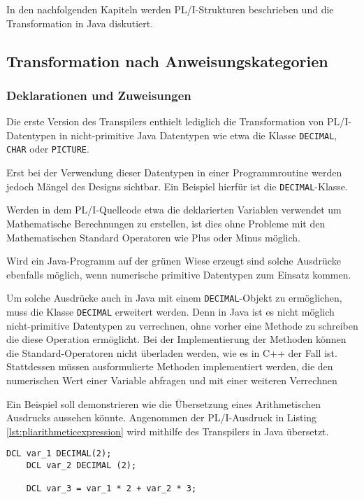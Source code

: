 In den nachfolgenden Kapiteln werden PL/I-Strukturen beschrieben und die Transformation in Java diskutiert.

\pagebreak
\subsection{Transformation nach Anweisungskategorien}
\subsubsection{Deklarationen und Zuweisungen}
Die erste Version des Transpilers enthielt lediglich die Transformation von PL/I-Datentypen in nicht-primitive Java Datentypen wie etwa die Klasse \verb+DECIMAL+, \verb+CHAR+ oder \verb+PICTURE+.


Erst bei der Verwendung dieser Datentypen in einer Programmroutine werden jedoch Mängel des Designs sichtbar. Ein Beispiel hierfür ist die \verb+DECIMAL+-Klasse.

Werden in dem PL/I-Quellcode etwa die deklarierten Variablen verwendet um Mathematische Berechnungen zu erstellen, ist dies ohne Probleme mit den Mathematischen Standard Operatoren wie Plus oder Minus möglich.

Wird ein Java-Programm auf der grünen Wiese erzeugt sind solche Ausdrücke ebenfalls möglich, wenn numerische primitive Datentypen zum Einsatz kommen.

Um solche Ausdrücke auch in Java mit einem \verb+DECIMAL+-Objekt zu ermöglichen, muss die Klasse \verb+DECIMAL+ erweitert werden.
Denn in Java ist es nicht möglich nicht-primitive Datentypen zu verrechnen, ohne vorher eine Methode zu schreiben die diese Operation ermöglicht. 
Bei der Implementierung der Methoden können die Standard-Operatoren nicht überladen werden, wie es in C++ der Fall ist.
Stattdessen müssen ausformulierte Methoden implementiert werden, die den numerischen Wert einer Variable abfragen und mit einer weiteren Verrechnen

Ein Beispiel soll demonstrieren wie die Übersetzung eines Arithmetischen Ausdrucks aussehen könnte.
Angenommen der PL/I-Ausdruck in Listing \ref{lst:pliarithmeticexpression} wird mithilfe des Transpilers in Java übersetzt.

\begin{lstlisting}[language=PL/I, caption=Arithmetischer Ausdruck in PL/I, label={lst:pliarithmeticexpression}]
	DCL var_1 DECIMAL(2);
	DCL var_2 DECIMAL (2);
	
	DCL var_3 = var_1 * 2 + var_2 * 3;
\end{lstlisting}
\pagebreak 
 
